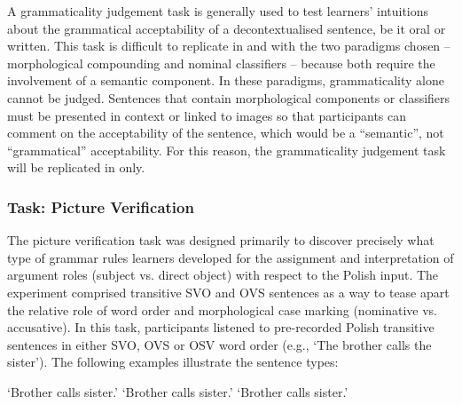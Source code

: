 \documentclass[output=paper,colorlinks,citecolor=brown,modfonts,nonflat]{../langscibook}
\begin{document}
A grammaticality judgement task is generally used to test learners’ intuitions about the grammatical acceptability of a decontextualised sentence, be it oral or written. This task is difficult to replicate in  and  with the two paradigms chosen – morphological compounding and nominal classifiers – because both require the involvement of a semantic component. In these paradigms, grammaticality alone cannot be judged. Sentences that contain morphological components or classifiers must be presented in context or linked to images so that participants can comment on the acceptability of the sentence, which would be a “semantic”, not “grammatical” acceptability. For this reason, the grammaticality judgement task will be replicated in  only. 

\subsubsection{Task: Picture Verification}

The picture verification task was designed primarily to discover precisely what type of grammar rules learners developed for the assignment and interpretation of argument roles (subject vs. direct object) with respect to the Polish input. The experiment comprised transitive SVO and OVS sentences as a way to tease apart the relative role of word order and morphological case marking (nominative vs. accusative). In this task, participants listened to pre-recorded Polish transitive sentences in either SVO, OVS or OSV word order (e.g., `The brother calls the sister'). The following examples illustrate the sentence types:

\ea%
    \label{ex:watorek:3}
        \glt    ‘Brother calls sister.’
        \glt    ‘Brother calls sister.’
        \glt    ‘Brother calls sister.’
    \z
\z
\end{document}
